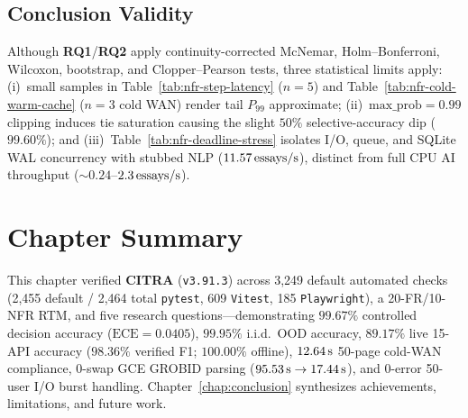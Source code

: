 \subsection{Conclusion Validity}

Although \textbf{RQ1}/\textbf{RQ2} apply continuity-corrected McNemar, Holm--Bonferroni, Wilcoxon, bootstrap, and Clopper--Pearson tests, three statistical limits apply: (i)~small samples in Table~\ref{tab:nfr-step-latency} ($n = 5$) and Table~\ref{tab:nfr-cold-warm-cache} ($n = 3$ cold WAN) render tail $P_{99}$ approximate; (ii)~$\text{max\_prob} = 0.99$ clipping induces tie saturation causing the slight $50\%$ selective-accuracy dip ($99.60\%$); and (iii)~Table~\ref{tab:nfr-deadline-stress} isolates I/O, queue, and SQLite WAL concurrency with stubbed NLP ($11.57\text{\,essays/s}$), distinct from full CPU AI throughput ($\sim 0.24$--$2.3\text{\,essays/s}$).

\section{Chapter Summary}

This chapter verified \textbf{CITRA} (\texttt{v3.91.3}) across 3,249 default automated checks (2,455 default / 2,464 total \texttt{pytest}, 609 \texttt{Vitest}, 185 \texttt{Playwright}), a 20-FR/10-NFR RTM, and five research questions---demonstrating $99.67\%$ controlled decision accuracy ($\text{ECE} = 0.0405$), $99.95\%$ i.i.d.\ OOD accuracy, $89.17\%$ live 15-API accuracy ($98.36\%$ verified F1; $100.00\%$ offline), $12.64\text{\,s}$ 50-page cold-WAN compliance, 0-swap GCE GROBID parsing ($95.53\text{\,s} \rightarrow 17.44\text{\,s}$), and 0-error 50-user I/O burst handling. Chapter~\ref{chap:conclusion} synthesizes achievements, limitations, and future work.
